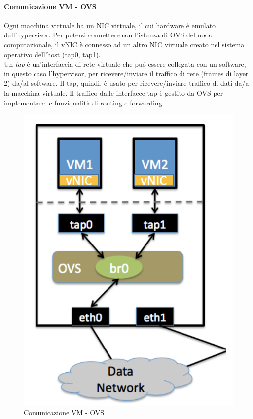 \documentclass{article}
\begin{document}
\paragraph{Comunicazione VM - OVS}
Ogni macchina virtuale ha un NIC virtuale, il cui hardware è emulato dall'hypervisor. Per potersi connettere con l'istanza di OVS del nodo computazionale, il vNIC è connesso ad un altro NIC virtuale creato nel sistema operativo dell'host (tap0, tap1). \\
Un \textit{tap} è un'interfaccia di rete virtuale che può essere collegata con un software, in questo caso l'hypervisor, per ricevere/inviare il traffico di rete (frames di layer 2) da/al software. Il tap, quindi, è usato per ricevere/inviare traffico di dati da/a la macchina virtuale. Il traffico dalle interfacce tap è gestito da OVS per implementare le funzionalità di routing e forwarding.
\begin{figure}[H]
    \centering
    \includegraphics[scale=0.5]{img/tap.png}
    \caption{Comunicazione VM - OVS}
\end{figure}\noindent
\end{document}
